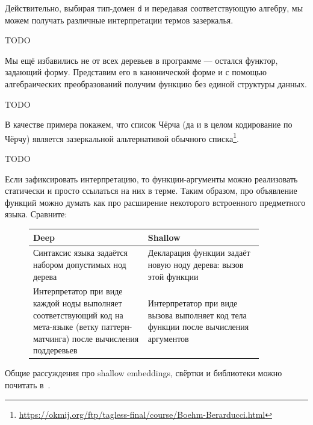 Действительно, выбирая тип-домен \texttt{d} и передавая соответствующую алгебру, мы можем получать различные интерпретации термов зазеркалья.

TODO %

Мы ещё избавились не от всех деревьев в программе --- остался функтор, задающий форму.
Представим его в канонической форме и с помощью алгебраических преобразований получим функцию без единой структуры данных.

TODO %

В качестве примера покажем, что список Чёрча (да и в целом кодирование по Чёрчу) является зазеркальной альтернативой обычного списка\footnote{\url{https://okmij.org/ftp/tagless-final/course/Boehm-Berarducci.html}}.

TODO %


Если зафиксировать интерпретацию, то функции-аргументы можно реализовать статически и просто ссылаться на них в терме.
Таким образом, про объявление функций можно думать как про расширение некоторого встроенного предметного языка.
Сравните:
\begin{figure}[h]
    \centering
    \begin{tabular}{|p{0.45\linewidth}|p{0.45\linewidth}|}
        \hline
        Deep                                                                                                                                 & Shallow                                                                              \\
        \hline
        Синтаксис языка задаётся набором допустимых нод дерева                                                                               & Декларация функции задаёт новую ноду дерева: вызов этой функции                      \\
        \hline
        Интерпретатор при виде каждой ноды выполняет соответствующий код на мета-языке (ветку паттерн-матчинга) после вычисления поддеревьев & Интерпретатор при виде вызова выполняет код тела функции после вычисления аргументов \\
        \hline
    \end{tabular}
\end{figure}

Общие рассуждения про shallow embeddings, свёртки и библиотеки можно почитать в~\cite{gibbons2013functional, gibbons2014folding}.

